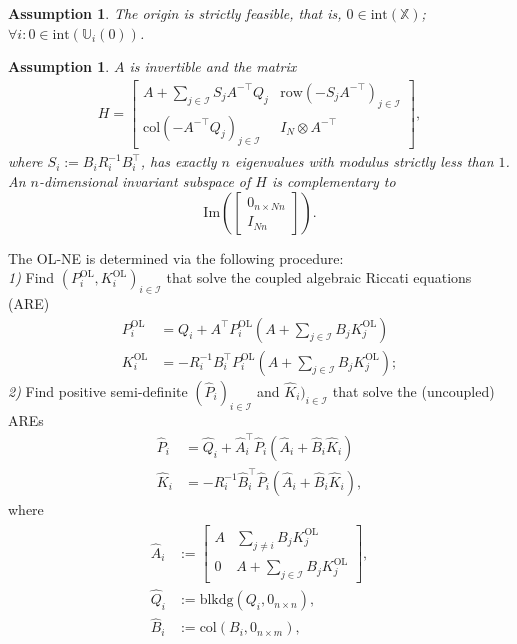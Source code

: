 \documentclass[letterpaper, 10 pt, conference]{ieeeconf}  %
\newcommand{\mc}{\mathcal}
\newcommand{\col}{\mathrm{col}}
\newcommand{\Pol}{P^{\mathrm{OL}}}
\newcommand{\Kol}{K^{\mathrm{OL}}}
\newcommand{\X}{\mathbb{X}}
\newcommand{\U}{\mathbb{U}}
\newcommand{\tsum}{\textstyle\sum}
\newcommand{\blkdiag}{\mathrm{blkdg}}
\newtheorem{assumption}[theorem]{Assumption}
\begin{document}
\begin{assumption}  \label{as:strict_feasibility} The origin is strictly feasible, that is,
    $0\in\mathrm{int}(\X)$; $\forall i: 0\in\mathrm{int}(\U_i(0))$.
\end{assumption}
\begin{assumption} \label{as:symplectic_matrix}
    $A$ is invertible and the matrix
    \begin{align*}
        H = \begin{bmatrix}
            A + \sum_{j\in\mc I}S_jA^{-\top}Q_j & \mathrm{row}(-S_jA^{-\top})_{j\in\mc I} \\
            \col(-A^{-\top}Q_j)_{j\in\mc I} & I_N \otimes A^{-\top}
        \end{bmatrix},
    \end{align*}
    where $S_i:=B_iR_i^{-1}B_i^{\top}$, has exactly $n$ eigenvalues with modulus strictly less than $1$. An $n$-dimensional invariant subspace of $H$ is complementary to
    \begin{equation*}
        \mathrm{Im}\left( \begin{bmatrix}0_{n\times Nn} \\ I_{Nn} \end{bmatrix} \right).
    \end{equation*}
\end{assumption}
The OL-NE is determined via the following procedure: \\
\emph{1)} Find $(\Pol_i, \Kol_i)_{i\in\mc I}$ that solve the coupled algebraic Riccati equations (ARE) \cite{freiling1999}
\begin{align}
    \Pol_i &= Q_i + A^\top\Pol_i(A +\tsum_{j\in\mc I}B_j \Kol_j) \\
    \Kol_i &= -R_i^{-1}B_i^{\top}\Pol_i(A +\tsum_{j\in\mc I}B_j \Kol_j);
\end{align}
\emph{2)} Find positive semi-definite $(\hat{P}_i)_{i\in\mc I}$ and $\hat{K}_i)_{i\in\mc I}$ that solve the (uncoupled) AREs 
\begin{subequations}
    \begin{align}
        \hat{P}_i &= \hat{Q}_i + \hat{A}_i^\top\hat{P}_i(\hat{A}_i+\hat{B}_i \hat{K}_i)\\
        \hat{K}_i &= -R_i^{-1}\hat{B}_i^{\top}\hat{P}_i(\hat{A}_i +\hat{B}_i \hat{K}_i),
    \end{align}
\end{subequations}
where 
\begin{align}
    \begin{split}
        \hat{A}_i &:= \begin{bmatrix}
        A & \tsum_{j\neq i} B_j \Kol_j \\
        0 & A + \tsum_{j\in\mc I} B_j \Kol_j
    \end{bmatrix}, \\
    \hat{Q}_i &:= \blkdiag(Q_i, 0_{n\times n}),\\
    \hat{B}_i &:= \col(B_i, 0_{n\times m}),
    \end{split}
\end{align}
\end{document}
